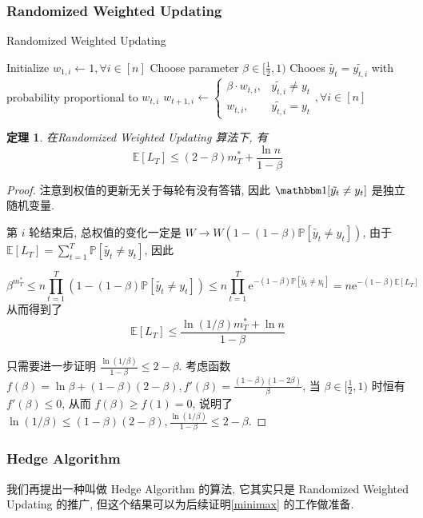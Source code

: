 \documentclass[8pt]{article}
\theoremstyle{compact}
\newtheorem{theorem}{定理}[section]
\def\le{\leqslant}
\def\ge{\geqslant}
\def\P#1{\mathbb{P}\left[{#1}\right]}
\def\E#1{\mathbb{E}\left[{#1}\right]}
\def\e{\mathrm{e}}
\begin{document}
\subsubsection{Randomized Weighted Updating}
\begin{algorithm}
	\caption{Randomized Weighted Updating}
	\begin{algorithmic}[1]
		\State Initialize $w_{1, i} \gets 1, \forall i \in [n]$
		\State Choose parameter $\beta \in [\frac12, 1)$
			\State Chooes $\tilde{y_t} = \tilde{y_{t, i}}$ with probability proportional to $w_{t, i}$
			\State $w_{t + 1, i} \gets \begin{cases}
				\beta \cdot w_{t, i}, & \tilde{y_{t, i}} \neq y_t\\
				w_{t, i}, & \tilde{y_{t, i}} = y_t
			\end{cases}, \forall i \in [n]$
		\EndFor
	\end{algorithmic}
\end{algorithm}
\begin{theorem}
	在Randomized Weighted Updating 算法下, 有 $$\E{L_T} \le (2 - \beta)m_T^* + \frac{\ln n}{1 - \beta}$$
	\label{random-weighted-update}
\end{theorem}
\begin{proof}
	注意到权值的更新无关于每轮有没有答错, 因此 $\mathbbm 1 [\tilde{y_t} \neq y_t]$ 是独立随机变量. 
	
	第 $i$ 轮结束后, 总权值的变化一定是 $W \to W(1 - (1 - \beta)\P{\tilde{y_t} \neq y_t})$, 由于 $\E{L_T} = \sum\limits_{t=1}^T\P{\tilde{y_t} \neq y_t}$, 因此

	$$\beta^{m_T^*} \le n \prod_{t=1}^{T}(1 - (1 - \beta)\P{\tilde{y_t} \neq y_t}) \le n\prod_{t=1}^{T}\e^{-(1-\beta)\P{\tilde{y_t} \neq y_t}} = n\e^{-(1 - \beta)\E{L_T}}$$ 从而得到了 $$\E{L_T} \le \frac{\ln(1/\beta)m_T^* + \ln n}{1 - \beta}$$

	只需要进一步证明 $\frac{\ln(1 / \beta)}{1 - \beta} \le 2 - \beta$. 考虑函数 $f(\beta) = \ln\beta + (1 - \beta)(2 - \beta), f'(\beta) = \frac{(1-  \beta)(1 - 2\beta)}{\beta}$, 当 $\beta \in [\frac12, 1)$ 时恒有 $f'(\beta) \le 0$, 从而 $f(\beta) \ge f(1) = 0$, 说明了 $\ln(1 / \beta) \le (1 - \beta)(2 - \beta), \frac{\ln(1 / \beta)}{1 - \beta} \le 2 - \beta$.
\end{proof}
\subsubsection{Hedge Algorithm}
我们再提出一种叫做 Hedge Algorithm 的算法, 它其实只是 Randomized Weighted Updating 的推广, 但这个结果可以为后续证明\cref{minimax} 的工作做准备.
\end{document}
